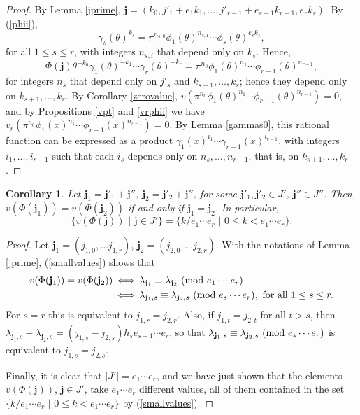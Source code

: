 \documentclass{amsart}
\newtheorem{corollary}[theorem]{Corollary}
\def\ga{\gamma}
\def\j{\mathbf{j}}
\def\la{\lambda}
\def\md#1{\ \mbox{\rm(mod }{#1})}
\def\sii{\,\Longleftrightarrow\,}
\def\t{\theta}
\def\tq{\,\,|\,\,}
\begin{document}
\begin{proof}
By Lemma \ref{jprime}, $\j=(k_0,j'_1+e_1k_1,\dots,j'_{r-1}+e_{r-1}k_{r-1},e_rk_r)$. By (\ref{phii}), $$\ga_s(\t)^{k_s}=\pi^{n_{s,0}}\phi_1(\t)^{n_{s,1}}\cdots \phi_s(\t)^{e_sk_s},$$
for all $1\le s\le r$, with integers $n_{s,i}$ that depend only on $k_s$. Hence,
$$\Phi(\j)\t^{-k_0}\ga_1(\t)^{-k_1}\cdots\ga_r(\t)^{-k_r}=\pi^{n_0}\phi_1(\t)^{n_1}\cdots \phi_{r-1}(\t)^{n_{r-1}},$$
for integers $n_s$ that depend only on $j'_s$ and $k_{s+1},\dots,k_r$; hence they depend only on $k_{s+1},\dots,k_r$.
By Corollary \ref{zerovalue}, $v(\pi^{n_0}\phi_1(\t)^{n_1}\cdots \phi_{r-1}(\t)^{n_{r-1}})=0$, and by Propositions \ref{vpt} and \ref{vrphii}
we have  $v_r(\pi^{n_0}\phi_1(x)^{n_1}\cdots \phi_{r-1}(x)^{n_{r-1}})=0$. By Lemma \ref{gammas0}, this rational function can be expressed as a product $\ga_1(x)^{i_1}\cdots \ga_{r-1}(x)^{i_{r-1}}$, with integers $i_1,\dots,i_{r-1}$ such that each $i_s$ depends only on $n_s,\dots,n_{r-1}$, that is, on $k_{s+1},\dots,k_r$.
\end{proof}

\begin{corollary}\label{samevalue}
Let $\j_1=\j'_1+\j''$, $\j_2=\j'_2+\j''$, for some $\j'_1,\j'_2\in J'$, $\j''\in J''$. Then, $v(\Phi(\j_1))=v(\Phi(\j_2))$ if and only if $\j_1=\j_2$. In particular, $$\{v(\Phi(\j))\tq\j\in J'\}=\{k/e_1\cdots e_r\tq 0\le k<e_1\cdots e_r\}.$$
\end{corollary}

\begin{proof}
Let $\j_1=(j_{1,0},\dots j_{1,r})$, $\j_2=(j_{2,0},\dots j_{2,r})$.
With the notations of Lemma \ref{jprime}, (\ref{smallvalues}) shows that 
\begin{align*}
v(\Phi(\j_1))=v(\Phi(\j_2))&\sii\la_{\j_1}\equiv \la_{\j_2}\md{e_1\cdots e_r}\\&\sii \la_{\j_1,s}\equiv \la_{\j_2,s}\md{e_s\cdots e_r}, \mbox{ for all }1\le s\le r.
\end{align*}
For $s=r$ this is equivalent to $j_{1,r}=j_{2,r}$. Also, if $j_{1,t}=j_{2,t}$ for all $t>s$, then
$\la_{\j_1,s}-\la_{\j_2,s}=(j_{1,s}-j_{2,s})h_se_{s+1}\cdots e_r$, so that $\la_{\j_1,s}\equiv \la_{\j_2,s}\md{e_s\cdots e_r}$ is equivalent to $j_{1,s}=j_{2,s}$.

Finally, it is clear that $|J'|=e_1\cdots e_r$, and we have just shown that the elements $v(\Phi(\j))$, $\j\in J'$, take $e_1\cdots e_r$ different values, all of them contained in the set $\{k/e_1\cdots e_r\tq 0\le k<e_1\cdots e_r\}$ by (\ref{smallvalues}).
\end{proof}
\end{document}

